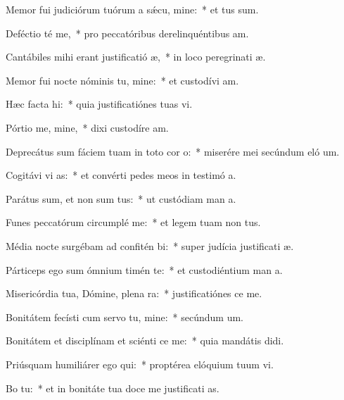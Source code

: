 \item Memor fui judiciórum tuórum a sǽcu, mine:~* et tus sum.
\item Deféctio té me,~* pro peccatóribus derelinquéntibus  am.
\item Cantábiles mihi erant justificatió æ,~* in loco peregrinati æ.
\item Memor fui nocte nóminis tu, mine:~* et custodívi  am.
\item Hæc facta  hi:~* quia justificatiónes tuas vi.
\item Pórtio me, mine,~* dixi custodíre  am.
\item Deprecátus sum fáciem tuam in toto cor o:~* miserére mei secúndum eló um.
\item Cogitávi vi as:~* et convérti pedes meos in testimó a.
\item Parátus sum, et non sum tus:~* ut custódiam man a.
\item Funes peccatórum circumplé  me:~* et legem tuam non  tus.
\item Média nocte surgébam ad confitén bi:~* super judícia justificati æ.
\item Párticeps ego sum ómnium timén te:~* et custodiéntium man a.
\item Misericórdia tua, Dómine, plena  ra:~* justificatiónes  ce me.
\item Bonitátem fecísti cum servo tu, mine:~* secúndum  um.
\item Bonitátem et disciplínam et sciénti ce me:~* quia mandátis  didi.
\item Priúsquam humiliárer ego qui:~* proptérea elóquium tuum vi.
\item Bo  tu:~* et in bonitáte tua doce me justificati as.

